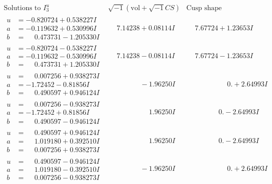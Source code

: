 \documentclass[1p]{elsarticle_modified}
\theoremstyle{definition}
\newcommand{\I}{\sqrt{-1}}
\begin{document}
$$\begin{array}{c|c|c}  
\text{Solutions to }I^u_{3}& \I (\text{vol} + \sqrt{-1}CS) & \text{Cusp shape}\\
 \hline 
\begin{aligned}
u &= -0.820724 + 0.538227 I \\
a &= -0.119632 + 0.530996 I \\
b &= \phantom{-}0.473731 - 1.205330 I\end{aligned}
 & \phantom{-}7.14238 + 0.08114 I & \phantom{-}7.67724 + 1.23653 I \\ \hline\begin{aligned}
u &= -0.820724 - 0.538227 I \\
a &= -0.119632 - 0.530996 I \\
b &= \phantom{-}0.473731 + 1.205330 I\end{aligned}
 & \phantom{-}7.14238 - 0.08114 I & \phantom{-}7.67724 - 1.23653 I \\ \hline\begin{aligned}
u &= \phantom{-}0.007256 + 0.938273 I \\
a &= -1.72452 - 0.81856 I \\
b &= \phantom{-}0.490597 + 0.946124 I\end{aligned}
 & \phantom{-0.000000 } -1.96250 I & \phantom{-0.000000 -}0. + 2.64993 I \\ \hline\begin{aligned}
u &= \phantom{-}0.007256 - 0.938273 I \\
a &= -1.72452 + 0.81856 I \\
b &= \phantom{-}0.490597 - 0.946124 I\end{aligned}
 & \phantom{-0.000000 -}1.96250 I & \phantom{-0.000000 } 0. - 2.64993 I \\ \hline\begin{aligned}
u &= \phantom{-}0.490597 + 0.946124 I \\
a &= \phantom{-}1.019180 + 0.392510 I \\
b &= \phantom{-}0.007256 + 0.938273 I\end{aligned}
 & \phantom{-0.000000 -}1.96250 I & \phantom{-0.000000 } 0. - 2.64993 I \\ \hline\begin{aligned}
u &= \phantom{-}0.490597 - 0.946124 I \\
a &= \phantom{-}1.019180 - 0.392510 I \\
b &= \phantom{-}0.007256 - 0.938273 I\end{aligned}
 & \phantom{-0.000000 } -1.96250 I & \phantom{-0.000000 -}0. + 2.64993 I \\ \hline\begin{aligned}

\end{aligned}
\end{array}$$
\end{document}
